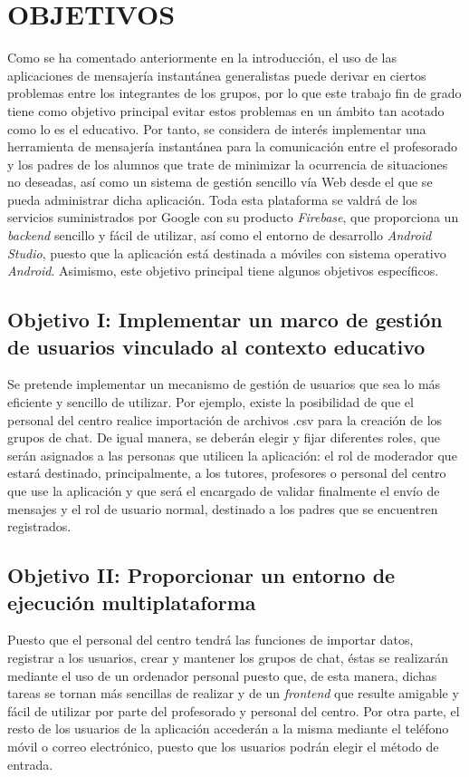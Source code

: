 \documentclass{pre-tfg}
\begin{document}
\section{OBJETIVOS}
Como se ha comentado anteriormente en la introducción, el uso de las aplicaciones de mensajería instantánea generalistas puede derivar en ciertos problemas entre los integrantes de los grupos, por lo que este trabajo fin de grado tiene como objetivo principal evitar estos problemas en un ámbito tan acotado como lo es el educativo. Por tanto, se considera de interés implementar una herramienta de mensajería instantánea para la comunicación entre el profesorado y los padres de los alumnos que trate de minimizar la ocurrencia de situaciones no deseadas, así como un sistema de gestión sencillo vía Web desde el que se pueda administrar dicha aplicación. Toda esta plataforma se valdrá de los servicios suministrados por Google con su producto \textit{Firebase}, que proporciona un \textit{backend} sencillo y fácil de utilizar, así como el entorno de desarrollo \textit{Android Studio}, puesto que la aplicación está destinada a móviles con sistema operativo \textit{Android}. Asimismo, este objetivo principal tiene algunos objetivos específicos.

\subsection{Objetivo I: Implementar un marco de gestión de usuarios vinculado al contexto educativo}
Se pretende implementar un mecanismo de gestión de usuarios que sea lo más eficiente y sencillo de utilizar. Por ejemplo, existe la posibilidad de que el personal del centro realice importación de archivos .csv para la creación de los grupos de chat. De igual manera, se deberán elegir y fijar diferentes roles, que serán asignados a las personas que utilicen la aplicación: el rol de moderador que estará destinado, principalmente, a los tutores, profesores o personal del centro que use la aplicación y que será el encargado de validar finalmente el envío de mensajes y el rol de usuario normal, destinado a los padres que se encuentren registrados.

\subsection{Objetivo II: Proporcionar un entorno de ejecución multiplataforma}
Puesto que el personal del centro tendrá las funciones de importar datos, registrar a los usuarios, crear y mantener los grupos de chat, éstas se realizarán mediante el uso de un ordenador personal puesto que, de esta manera, dichas tareas se tornan más sencillas de realizar y de un \textit{frontend} que resulte amigable y fácil de utilizar por parte del profesorado y personal del centro. Por otra parte, el resto de los usuarios de la aplicación accederán a la misma mediante el teléfono móvil o correo electrónico, puesto que los usuarios podrán elegir el método de entrada.
\end{document}
